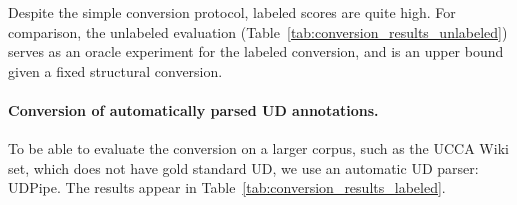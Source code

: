 \documentclass[11pt,a4paper]{article}
\begin{document}
Despite the simple conversion protocol, labeled scores are quite high.
For comparison, the unlabeled evaluation (Table~\ref{tab:conversion_results_unlabeled})
serves as an oracle experiment for the labeled conversion,
and is an upper bound given a fixed structural conversion.

\paragraph{Conversion of automatically parsed UD annotations.}

To be able to evaluate the conversion on a larger corpus,
such as the UCCA Wiki set, which does not have gold standard UD,
we use an automatic UD parser: UDPipe.
The results appear in Table~\ref{tab:conversion_results_labeled}.


\end{document}
